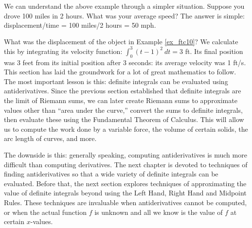 We can understand the above example through a simpler situation. Suppose you drove 100 miles in 2 hours. What was your average speed? The answer is simple: displacement/time = 100 miles/2 hours = 50 mph.

What was the displacement of the object in Example \ref{ex_ftc10}? We calculate this by integrating its velocity function: $\int_0^3 (t-1)^2\ dt = 3$ ft. Its final position was 3 feet from its initial position after 3 seconds: its average velocity was 1 ft/s.\\

This section has laid the groundwork for a lot of great mathematics to follow. The most important lesson is this: definite integrals can be evaluated using antiderivatives. Since the previous section established that definite integrals are the limit of Riemann sums, we can later create Riemann sums to approximate values other than ``area under the curve,'' convert the sums to definite integrals, then evaluate these using the Fundamental Theorem of Calculus. This will allow us to compute the work done by a variable force, the volume of certain solids, the arc length of curves, and more.

The downside is this: generally speaking, computing antiderivatives is much more difficult than computing derivatives. The next chapter is devoted to techniques of finding antiderivatives so that a wide variety of definite integrals can be evaluated. Before that, the next section explores techniques of approximating the value of definite integrals beyond using the Left Hand, Right Hand and Midpoint Rules. These techniques are invaluable when antiderivatives cannot be computed, or when the actual function $f$ is unknown and all we know is the value of $f$ at certain $x$-values.

